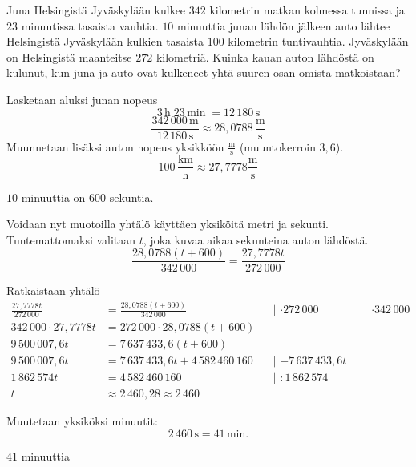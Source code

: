 \begin{esimerkki}
Juna Helsingistä Jyväskylään kulkee $342$ kilometrin matkan kolmessa tunnissa ja $23$ minuutissa tasaista vauhtia. $10$ minuuttia junan lähdön jälkeen auto lähtee Helsingistä Jyväskylään kulkien tasaista $100$ kilometrin tuntivauhtia. Jyväskylään on Helsingistä maanteitse $272$ kilometriä. Kuinka kauan auton lähdöstä on kulunut, kun juna ja auto ovat kulkeneet yhtä suuren osan omista matkoistaan?
	\begin{esimratk}
		Lasketaan aluksi junan nopeus
		\[3\,\text{h} \; 23\,\text{min} \; = 12\,180\,\text{s} \]
		\[\frac{342\,000\,\text{m}}{12\,180\,\text{s}} \approx  28,0788\,\frac{\text{m}}{\text{s}} \]
		Muunnetaan lisäksi auton nopeus yksikköön $\frac{\text{m}}{\text{s}}$ (muuntokerroin $3,6$).
		\[100\,\frac{\text{km}}{\text{h}} \approx 27,7778 \frac{\text{m}}{\text{s}} \]
		
		$10$ minuuttia on $600$ sekuntia.
		
		Voidaan nyt muotoilla yhtälö käyttäen yksiköitä metri ja sekunti. Tuntemattomaksi valitaan $t$, joka kuvaa aikaa sekunteina auton lähdöstä.
		\[ \frac{28,0788(t+600)}{342\,000} = \frac{27,7778t}{272\,000} \]
		
		Ratkaistaan yhtälö
		\begin{align*}
			\frac{27,7778t}{272\,000} &= \frac{28,0788(t+600)}{342\,000} &&\text{| $\cdot{272\,000}$} &&\text{| $\cdot{342\,000}$}  \\
			342\,000 \cdot 27,7778t &= 272\,000 \cdot 28,0788(t+600) \\
			9\,500\,007,6t &= 7\,637\,433,6(t+600) \\
			9\,500\,007,6t &= 7\,637\,433,6t + 4\,582\,460\,160 &&\text{| $-7\,637\,433,6t$} \\ 
			1\,862\,574t &= 4\,582\,460\,160 &&\text{| $:{1\,862\,574}$} \\
			t &\approx 2\,460,28 \approx 2\,460
		\end{align*}
		
		Muutetaan yksiköksi minuutit:
		\[2\,460\,\text{s}=41\,\text{min}.\]
	\end{esimratk}
	\begin{esimvast}
		$41$ minuuttia
	\end{esimvast}
\end{esimerkki}

%

